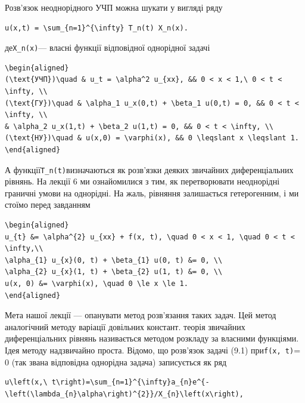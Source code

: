 \documentclass[
  ukrainian,
]{article}
\begin{document}
Розв'язок неоднорідного УЧП можна шукати у вигляді ряду

\begin{verbatim}
u(x,t) = \sum_{n=1}^{\infty} T_n(t) X_n(x).
\end{verbatim}

де\texttt{X\_n(x)}--- власні функції відповідної однорідної задачі

\begin{verbatim}
\begin{aligned}
(\text{УЧП})\quad & u_t = \alpha^2 u_{xx}, && 0 < x < 1,\ 0 < t < \infty, \\
(\text{ГУ})\quad & \alpha_1 u_x(0,t) + \beta_1 u(0,t) = 0, && 0 < t < \infty, \\
& \alpha_2 u_x(1,t) + \beta_2 u(1,t) = 0, && 0 < t < \infty, \\
(\text{НУ})\quad & u(x,0) = \varphi(x), && 0 \leqslant x \leqslant 1.
\end{aligned}
\end{verbatim}

А функції\texttt{T\_n(t)}визначаються як розв'язки деяких звичайних
диференціальних рівнянь. На лекції 6 ми ознайомилися з тим, як
перетворювати неоднорідні граничні умови на однорідні. На жаль, рівняння
залишається гетерогенним, і ми стоїмо перед завданням

\begin{verbatim}
\begin{aligned}
u_{t} &= \alpha^{2} u_{xx} + f(x, t), \quad 0 < x < 1, \quad 0 < t < \infty,\\
\alpha_{1} u_{x}(0, t) + \beta_{1} u(0, t) &= 0, \\
\alpha_{2} u_{x}(1, t) + \beta_{2} u(1, t) &= 0, \\
u(x, 0) &= \varphi(x), \quad 0 \le x \le 1.
\end{aligned}
\end{verbatim}

Мета нашої лекції --- опанувати метод розв'язання таких задач. Цей метод
аналогічний методу варіації довільних констант. теорія звичайних
диференціальних рівнянь називається методом розкладу за власними
функціями. Ідея методу надзвичайно проста. Відомо, що розв'язок задачі
(9.1) при\texttt{f(x,\ t)}= 0 (так звана відповідна однорідна задача)
записується як ряд

\begin{verbatim}
u\left(x,\ t\right)=\sum_{n=1}^{\infty}a_{n}e^{-\left(\lambda_{n}\alpha\right)^{2}}/X_{n}\left(x\right),
\end{verbatim}
\end{document}
